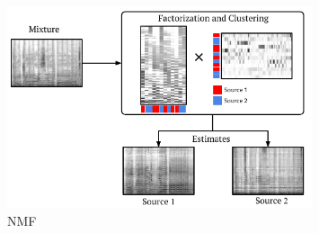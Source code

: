 \begin{figure}
  \centering
  \includegraphics[width=0.8\textwidth]{Chapters/06_Separation_Unknown/figures/nmf_separation.pdf}
  \caption{NMF}
  \label{fig:nmf_separation}
\end{figure}

